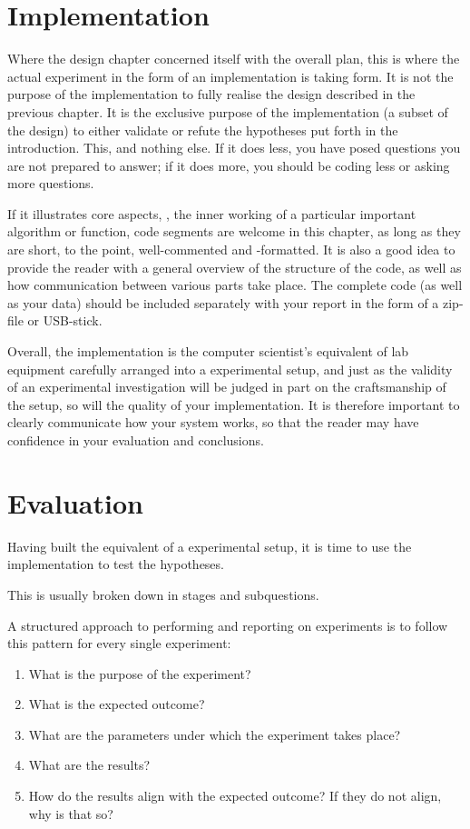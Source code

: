 \documentclass[ twoside,openright,titlepage,numbers=noenddot,headinclude,%
                footinclude=true,cleardoublepage=empty,abstractoff, %
                BCOR=5mm,paper=a4,fontsize=11pt,%
                ngerman,american,%
                ]{scrreprt}
\begin{document}
\chapter{Implementation}
\label{cha:implementation}

Where the design chapter concerned itself with the overall plan, this
is where the actual experiment in the form of an implementation is
taking form.  It is not the purpose of the implementation to fully
realise the design described in the previous chapter. It is the
exclusive purpose of the implementation (a subset of the design) to
either validate or refute the hypotheses put forth in the
introduction. This, and nothing else. If it does less, you have posed
questions you are not prepared to answer; if it does more, you should
be coding less or asking more questions.

If it illustrates core aspects, \eg, the inner working of a particular
important algorithm or function, code segments are welcome in this
chapter, as long as they are short, to the point, well-commented and
-formatted.  It is also a good idea to provide the reader with a
general overview of the structure of the code, as well as how
communication between various parts take place.  The complete code (as
well as your data) should be included separately with your report in
the form of a zip-file or USB-stick.

Overall, the implementation is the computer scientist's equivalent of
lab equipment carefully arranged into a experimental setup, and just
as the validity of an experimental investigation will be judged in
part on the craftsmanship of the setup, so will the quality of your
implementation. It is therefore important to clearly communicate how
your system works, so that the reader may have confidence in your
evaluation and conclusions.


\chapter{Evaluation}
\label{cha:evaluation}

Having built the equivalent of a experimental setup, it is time to use
the implementation to test the hypotheses.

This is usually broken down in stages and subquestions.

A structured approach to performing and reporting on experiments is
to follow this pattern for every single experiment:

\begin{enumerate}
\item What is the purpose of the experiment?
\item What is the expected outcome?
\item What are the parameters under which the experiment takes place?
\item What are the results?
\item How do the results align with the expected outcome? If they do
  not align, why is that so?
\end{enumerate}
\end{document}
